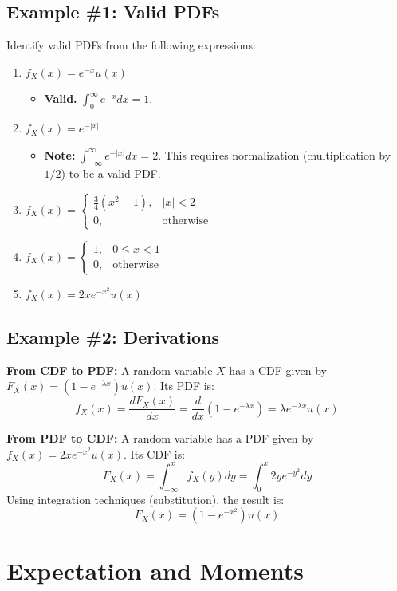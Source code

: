 \documentclass[11pt]{article}
\begin{document}
\subsection{Example \#1: Valid PDFs}
Identify valid PDFs from the following expressions:
\begin{enumerate}
    \item $f_{X}(x) = e^{-x}u(x)$
    \begin{itemize}
        \item \textbf{Valid.} $\int_0^\infty e^{-x}dx = 1$.
    \end{itemize}
    \item $f_{X}(x) = e^{-|x|}$
    \begin{itemize}
        \item \textbf{Note:} $\int_{-\infty}^{\infty} e^{-|x|} dx = 2$. This requires normalization (multiplication by $1/2$) to be a valid PDF.
    \end{itemize}
    \item $f_{X}(x) = \begin{cases} \frac{3}{4}(x^2 - 1), & |x| < 2 \\ 0, & \text{otherwise} \end{cases}$
    \item $f_{X}(x) = \begin{cases} 1, & 0 \le x < 1 \\ 0, & \text{otherwise} \end{cases}$
    \item $f_{X}(x) = 2xe^{-x^{2}}u(x)$
\end{enumerate}

\subsection{Example \#2: Derivations}
\textbf{From CDF to PDF:}
A random variable $X$ has a CDF given by $F_{X}(x) = (1 - e^{-\lambda x})u(x)$. Its PDF is:
$$ f_{X}(x) = \frac{dF_{X}(x)}{dx} = \frac{d}{dx}(1 - e^{-\lambda x}) = \lambda e^{-\lambda x}u(x) $$

\textbf{From PDF to CDF:}
A random variable has a PDF given by $f_{X}(x) = 2xe^{-x^{2}}u(x)$. Its CDF is:
$$ F_{X}(x) = \int_{-\infty}^{x} f_{X}(y) dy = \int_{0}^{x} 2ye^{-y^{2}} dy $$
Using integration techniques (substitution), the result is:
$$ F_{X}(x) = (1 - e^{-x^{2}})u(x) $$

\section{Expectation and Moments}
\end{document}
